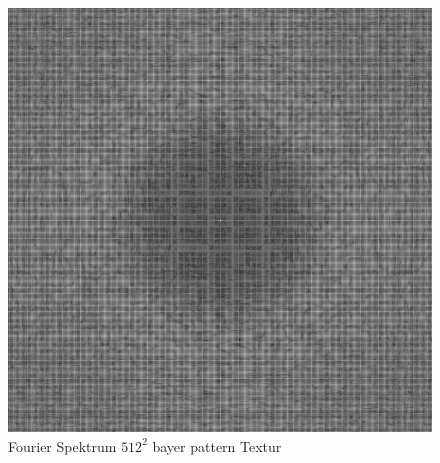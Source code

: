 \begin{figure}[H]
\begin{minipage}[t]{0.45\linewidth}
        \includegraphics[width=\linewidth]{content/BlueNoise/Bilder/FFT_BlueNoise64Tiled.png}
        \caption{Fourier Spektrum $512^{2}$ bayer pattern Textur}
    \end{minipage}
\end{figure}